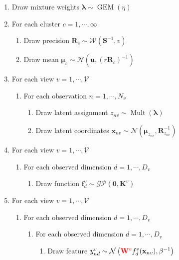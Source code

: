 \documentclass[]{article}
\newcommand{\gD}[2]{\mathcal{N}\left(#1,#2\right)}
\begin{document}
\begin{enumerate}
	\item Draw mixture weights $\boldsymbol{\lambda}\sim \operatorname{GEM}(\eta)$
	\item For each cluster $c = 1, \cdots,\infty $
	\begin{enumerate}
		\item Draw precision $\mathbf{R}_c \sim \mathcal{W}(\mathbf{S}^{-1},v)$
		\item Draw mean $\boldsymbol{\mu}_c \sim \mathcal{N}(\mathbf{u},(r\mathbf{R}_c)^{-1})$
	\end{enumerate}
	
	\item For each view $v = 1, \cdots,\mathcal{V} $
	\begin{enumerate}
		\item For each observation $n = 1,\cdots,N_v$
	\begin{enumerate}
		\item Draw latent assignment $z_{nv} \sim \operatorname{Mult}(\boldsymbol{\lambda})$
		\item Draw latent coordinates $\mathbf{x}_{nv} \sim \mathcal{N}(\boldsymbol{\mu}_{z_{nv}},\mathbf{R}_{z_{nv}}^{-1})$
	\end{enumerate}
	\end{enumerate}

	\item For each view $v = 1, \cdots,\mathcal{V} $
	\begin{enumerate}
		\item For each observed dimension $d = 1,\cdots,D_v$
		\begin{enumerate}
			\item Draw function $\mathbf{f}_{d}^{v} \sim \mathcal{GP}(\mathbf{0},\mathbf{K}^{v})$
		\end{enumerate}
	\end{enumerate}

	\item For each view $v = 1, \cdots,\mathcal{V} $
	\begin{enumerate}
		\item For each observed dimension $d = 1,\cdots,D_v$
		\begin{enumerate}
			\item For each observed dimension $d = 1,\cdots,D_v$
			\begin{enumerate}
				\item Draw feature $y_{nd}^{v}\sim \gD{\textcolor{red}{\mathbf{W}^v}f_d^{v}(\mathbf{x}_{nv})}{\beta^{-1}}$
			\end{enumerate}
		\end{enumerate}
	\end{enumerate}
\end{enumerate}
\end{document}
